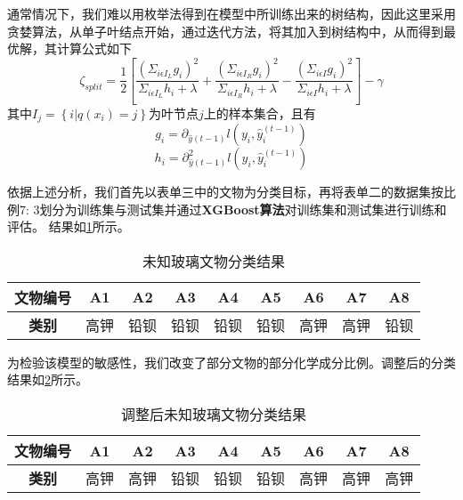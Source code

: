 \documentclass{MathModeling}
\begin{document}
	通常情况下，我们难以用枚举法得到在模型中所训练出来的树结构，因此这里采用贪婪算法，从单子叶结点开始，通过迭代方法，将其加入到树结构中，从而得到最优解，其计算公式\textcolor{blue}{\cite{pxgboost3}}如下
	\begin{equation}
		\zeta _{split}=\frac{1}{2}\left[ \frac{\left( \Sigma _{i\epsilon I_L}g_i \right) ^2}{\varSigma _{i\epsilon I_L}h_i+\lambda}+\frac{\left( \Sigma _{i\epsilon I_R}g_i \right) ^2}{\Sigma _{i\epsilon I_R}h_i+\lambda}-\frac{\left( \Sigma _{i\epsilon I}g_i \right) ^2}{\Sigma _{i\epsilon I}h_i+\lambda} \right] -\gamma
	\end{equation}
	其中$I_j=\left\{ i|q\left( x_i \right) =j \right\}$为叶节点$j$上的样本集合\textcolor{blue}{\cite{pxgboost2}}，且有
	\begin{equation}
		g_i=\partial _{\hat{y}\left( t-1 \right)}l\left( y_i,\hat{y}_{i}^{\left( t-1 \right)} \right) 
	\end{equation}
	\begin{equation}
		h_i=\partial _{\hat{y}\left( t-1 \right)}^{2}l\left( y_i,\hat{y}_{i}^{\left( t-1 \right)} \right) 	
	\end{equation}
	
	\newpage
	依据上述分析，我们{\heiti 首先}以表单三中的文物为分类目标，{\heiti 再}将表单二的数据集按比例7: 3划分为训练集与测试集并通过{\textbf{XGBoost算法}}对训练集和测试集进行训练和评估。 结果如\textcolor{blue}{\cref{分类结果}}所示。
\begin{table}[htbp]
	\centering
	\caption{未知玻璃文物分类结果}
	  \begin{tabular}{ccccccccc}
	  \toprule
	  \textbf{文物编号} & A1    & A2    & A3    & A4    & A5    & A6    & A7    & A8 \\
	  \midrule
	  \textbf{类别} & 高钾    & 铅钡    & 铅钡    & 铅钡    & 铅钡    & 高钾    & 高钾    & 铅钡 \\
	  \bottomrule
	  \end{tabular}%
	\label{分类结果}%
  \end{table}%
  
  为检验该模型的敏感性，我们改变了部分文物的部分化学成分比例。调整后的分类结果如\textcolor{blue}{\cref{调整后的分类结果}}所示。
\begin{table}[htbp]
	\centering
	\caption{调整后未知玻璃文物分类结果}
	  \begin{tabular}{ccccccccc}
	  \toprule
	  \textbf{文物编号} & A1    & A2    & A3    & A4    & A5    & A6    & A7    & A8 \\
	  \midrule
	  \textbf{类别} & 高钾    & 高钾    & 铅钡    & 铅钡    & 铅钡    & 高钾    & 高钾    & 高钾 \\
	  \bottomrule
	  \end{tabular}%
	\label{调整后的分类结果}%
  \end{table}%
 
\end{document}
